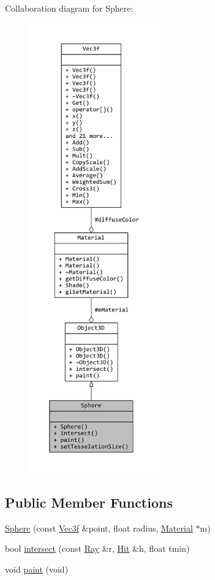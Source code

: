 Collaboration diagram for Sphere\+:
\nopagebreak
\begin{figure}[H]
\begin{center}
\leavevmode
\includegraphics[height=550pt]{classSphere__coll__graph}
\end{center}
\end{figure}
\subsection*{Public Member Functions}
\begin{DoxyCompactItemize}
\item 
\hyperlink{classSphere_aa165eb2886cd16fd67052a2e8e92f6b2}{Sphere} (const \hyperlink{classVec3f}{Vec3f} \&point, float radius, \hyperlink{classMaterial}{Material} $\ast$m)
\item 
bool \hyperlink{classSphere_a87f585d7a2618e8b8974968d4624c92a}{intersect} (const \hyperlink{classRay}{Ray} \&r, \hyperlink{classHit}{Hit} \&h, float tmin)
\item 
void \hyperlink{classSphere_ab37cab8d0eb2988fb9dc66725b9a632d}{paint} (void)
\end{DoxyCompactItemize}
